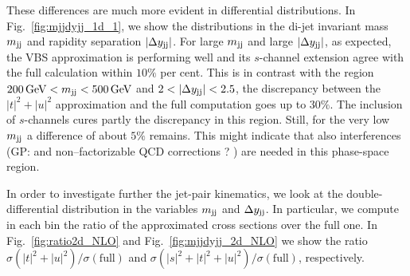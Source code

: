 These differences are much more evident in differential distributions.
In Fig.~\ref{fig:mjjdyjj_1d_1}, we show the distributions in the di-jet invariant mass $m_{\text{j}\text{j}}$ and rapidity separation $|\Delta y_{\text{j}\text{j}}|$.
For large $m_{\text{j}\text{j}}$ and large $|\Delta y_{\text{j}\text{j}}|$, as expected, the VBS approximation is performing well and its $s$-channel extension agree with the full calculation within $10\%$ per cent.
This is in contrast with the region  $200 \,\text{GeV} < m_{\text{j}\text{j}} < 500 \,\text{GeV}$ and $2<|\Delta y_{\Pj\Pj}|<2.5$, the discrepancy between the $|t|^2 + |u|^2$ approximation and the full computation goes up to $30\%$.
The inclusion of $s$-channels cures partly the discrepancy in this region.
Still, for the very low $m_{\text{j}\text{j}}$ a difference of about $5\%$ remains.
This might indicate that also interferences (GP: and non--factorizable QCD corrections ? ) are needed in this phase-space region.

In order to investigate further the jet-pair kinematics, we look at the double-differential distribution in the variables $m_{\text{j}\text{j}}$ and $\Delta y_{\text{j}\text{j}}$.
In particular, we compute in each bin the ratio of the approximated cross sections over the full one.
In Fig.~\ref{fig:ratio2d_NLO} and Fig.~\ref{fig:mjjdyjj_2d_NLO} we show the ratio $\sigma(|t|^2 + |u|^2)/\sigma(\textrm{full})$ and $\sigma(|s|^2+|t|^2 + |u|^2)/\sigma(\textrm{full})$, respectively.


